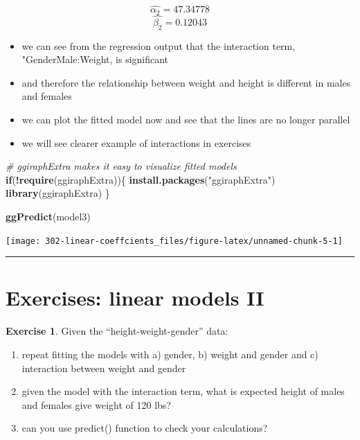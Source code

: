 \documentclass[
]{book}
\newenvironment{Shaded}{\begin{snugshade}}{\end{snugshade}}
\newcommand{\CommentTok}[1]{\textcolor[rgb]{0.56,0.35,0.01}{\textit{#1}}}
\newcommand{\ControlFlowTok}[1]{\textcolor[rgb]{0.13,0.29,0.53}{\textbf{#1}}}
\newcommand{\KeywordTok}[1]{\textcolor[rgb]{0.13,0.29,0.53}{\textbf{#1}}}
\newcommand{\NormalTok}[1]{#1}
\newcommand{\OperatorTok}[1]{\textcolor[rgb]{0.81,0.36,0.00}{\textbf{#1}}}
\newcommand{\StringTok}[1]{\textcolor[rgb]{0.31,0.60,0.02}{#1}}
\providecommand{\tightlist}{%
  \setlength{\itemsep}{0pt}\setlength{\parskip}{0pt}}
\theoremstyle{definition}
\theoremstyle{definition}
\theoremstyle{definition}
\newtheorem{exercise}{Exercise}[chapter]
\theoremstyle{remark}
\begin{document}
\[\hat{\alpha_2} = 47.34778\]
\[\hat{\beta_2} = 0.12043\]

\begin{itemize}
\tightlist
\item
  we can see from the regression output that the interaction term, "GenderMale:Weight, is significant
\item
  and therefore the relationship between weight and height is different in males and females
\item
  we can plot the fitted model now and see that the lines are no longer parallel
\item
  we will see clearer example of interactions in exercises
\end{itemize}

\begin{Shaded}
\begin{Highlighting}[]
\CommentTok{\# ggiraphExtra makes it easy to visualize fitted models}
\ControlFlowTok{if}\NormalTok{(}\OperatorTok{!}\KeywordTok{require}\NormalTok{(ggiraphExtra))\{}
    \KeywordTok{install.packages}\NormalTok{(}\StringTok{"ggiraphExtra"}\NormalTok{)}
    \KeywordTok{library}\NormalTok{(ggiraphExtra)}
\NormalTok{\}}

\KeywordTok{ggPredict}\NormalTok{(model3)}
\end{Highlighting}
\end{Shaded}

\begin{center}\texttt{[image: 302-linear-coeffcients\_files/figure-latex/unnamed-chunk-5-1]} \end{center}

\begin{center}\rule{0.5\linewidth}{0.5pt}\end{center}

\hypertarget{exercises-linear-models-ii}{%
\section{Exercises: linear models II}\label{exercises-linear-models-ii}}

\begin{exercise}
\protect\hypertarget{exr:lm-rerun}{}{\label{exr:lm-rerun} }
Given the ``height-weight-gender'' data:

\begin{enumerate}
\def\labelenumi{\alph{enumi})}
\tightlist
\item
  repeat fitting the models with a) gender, b) weight and gender and c) interaction between weight and gender
\item
  given the model with the interaction term, what is expected height of males and females give weight of 120 lbs?
\item
  can you use predict() function to check your calculations?
\end{enumerate}
\end{exercise}
\end{document}
